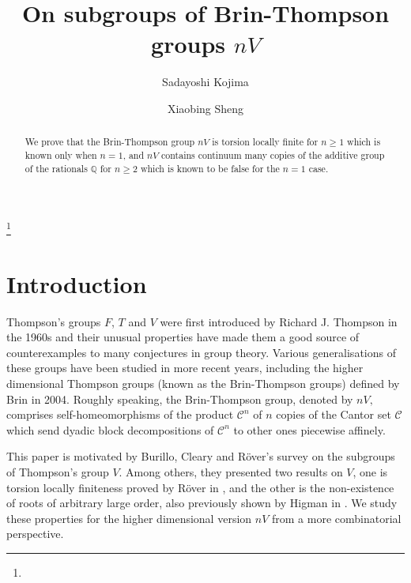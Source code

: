 \documentclass[12pt,reqno]{amsart}
\theoremstyle{plain}
\theoremstyle{definition}
\theoremstyle{remark}
\numberwithin{equation}{section}
\begin{document}
%
%

\title{%
	On subgroups of Brin-Thompson groups  $nV$ 
}

\author[S. Kojima]{%
    Sadayoshi Kojima
}
\address{%
	Tokyo Institute of Technology, 
	Professor Emiritus 
} 
\author[X. Sheng]{%
	Xiaobing Sheng
} 
\address{%
	The University of Osaka  
}
\thanks{%
} 

\begin{abstract} 
	We prove that the Brin-Thompson group  $nV$  is 
	torsion locally finite for  $ n \geq 1$  which is known 
	only when  $n = 1$, 
	and  $nV$  contains continuum many copies of
	the additive group of the rationals  $\mathbb{Q}$  for  $n \geq 2$  which is known 
	to be false for the  $n = 1$ case.  
\end{abstract} 


\maketitle



%
%
\section{Introduction}\label{Sec:Introduction}   

Thompson's groups $F$, $T$ and $V$  
were first introduced by Richard J. Thompson in the 1960s 
and their unusual properties have made them a good source of counterexamples 
to many conjectures in group theory.
Various generalisations of these groups have been studied in more recent years, 
including the higher dimensional Thompson groups 
(known as the Brin-Thompson groups) 
defined by Brin \cite{Brin} in 2004. 
Roughly speaking, the Brin-Thompson group, denoted by  $nV,$ 
comprises self-homeomorphisms of the product $\mathcal{C}^{n}$ of $n$ copies 
of the Cantor set $\mathcal{C}$ 
which send dyadic block decompositions of  $\mathcal{C}^n$  to other ones 
piecewise affinely.  

This paper is motivated by Burillo, Cleary and R\"over's survey \cite{BCR}  
on the subgroups of Thompson's group $V$.  
Among others, 
they presented two results on  $V$,  
one is torsion locally finiteness proved by R\"over in  \cite{R, Rover}, 
and the other is the non-existence of roots of arbitrary large order, 
also previously shown by Higman in  \cite{Higman}.   
We study these properties for the higher dimensional version $nV$ 
from a more combinatorial perspective.  
\end{document}
